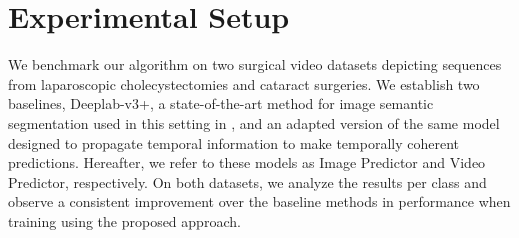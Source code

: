 \documentclass[twoside, print]{ieeecolor_arxiv}
\begin{document}
\section{Experimental Setup}

We benchmark our algorithm on two surgical video datasets depicting sequences from laparoscopic cholecystectomies and cataract surgeries. We establish two baselines, Deeplab-v3+, a state-of-the-art method for image semantic segmentation used in this setting in \cite{mascagni2021artificial}, and an adapted version of the same model designed to propagate temporal information to make temporally coherent predictions. Hereafter, we refer to these models as Image Predictor and Video Predictor, respectively. On both datasets, we analyze the results per class and observe a consistent improvement over the baseline methods in performance when training using the proposed approach.
\label{sec:guidelines}
\end{document}
